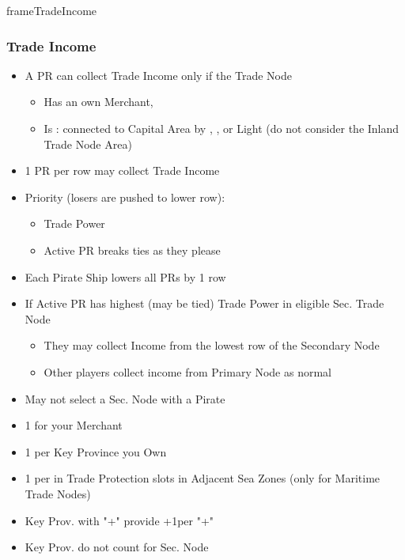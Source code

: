 \documentclass[10pt]{article}
\newlength{\fhTrade} \setlength\fhTrade{40.5\baselineskip}
\begin{document}
\begin{dynamiccontents*}{frameTradeIncome}\begin{eubox}{\fhTrade}
	\subsubsection*{Trade Income }
	\begin{itemize}
		\item A PR can collect Trade Income only if the Trade Node
		\begin{itemize}
			\item Has an own Merchant, 
			\item Is : connected to Capital Area by \towns, \vassals, \influence or Light \ships (do not consider the Inland Trade Node Area)
		\end{itemize}
		\item 1 PR per row may collect Trade Income
		\item Priority (losers are pushed to lower row):
		\begin{itemize}
			\item Trade Power
			\item Active PR breaks ties as they please
		\end{itemize}
		\item Each Pirate Ship lowers all PRs by 1 row
	\end{itemize}
	\begin{itemize}
		\item If Active PR has highest (may be tied) Trade Power in eligible Sec. Trade Node
		\begin{itemize}
			\item They may collect Income from the lowest row of the Secondary Node
			\item Other players collect income from Primary Node as normal
		\end{itemize}
		\item May not select a Sec. Node with a Pirate
	\end{itemize}
	\begin{itemize}
		\item 1 \tradepower for your Merchant
		\item 1 \tradepower per Key Province you Own
		\item 1 \tradepower per \ship in Trade Protection slots in Adjacent Sea Zones (only for Maritime Trade Nodes)
		\item Key Prov. with "+" provide +1\tradepower per "+"
		\item Key Prov. do not count for Sec. Node
	\end{itemize}
	{\botrules
}
\end{eubox}
\end{dynamiccontents*}
\end{document}
